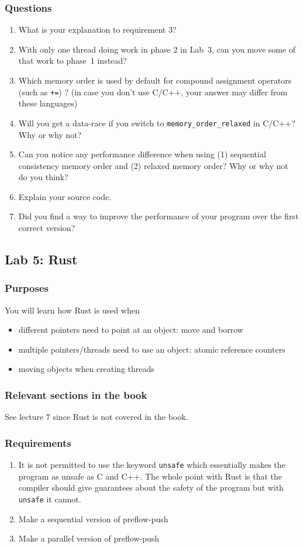 \documentclass{forsete}
\begin{document}
\subsubsection*{Questions}
\begin{enumerate}
\item What is your explanation to requirement 3?
\item With only one thread doing work in phase 2 in Lab~3, can you move some of that work to phase~1 instead?
\item Which memory order is used by default for compound assignment operators (such as \verb.+=.) ?  (in case you don't use C/C++, your answer may differ from these languages)
\item Will you get a data-race if you switch to \verb.memory_order_relaxed. in C/C++? Why or why not?
\item Can you notice any performance difference when using (1) sequential consistency memory order
and (2) relaxed memory order? Why or why not do you think?
\item Explain your source code.
\item Did you find a way to improve the performance of your program over the first correct version?

\end{enumerate}

\newpage
\subsection*{Lab 5: Rust}
\subsubsection*{Purposes}
You will learn how Rust is used when
\begin{itemize}
\item different pointers need to point at an object: move and borrow
\item multiple pointers/threads need to use an object: atomic reference counters
\item moving objects when creating threads
\end{itemize}

\subsubsection*{Relevant sections in the book}
See lecture 7 since Rust is not covered in the book.
\subsubsection*{Requirements}
\begin{enumerate}
\item It is not permitted to use the keyword \verb.unsafe. which essentially makes the program as unsafe as C and C++. The whole point with Rust is that the compiler should give guarantees about the safety of the program but with \verb.unsafe. it cannot.
\item Make a sequential version of preflow-push
\item Make a parallel version of preflow-push
\end{enumerate}
\end{document}
